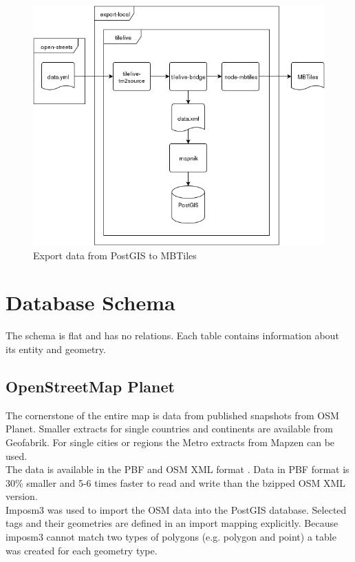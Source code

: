 \begin{figure}[H]
\centering
  \includegraphics[scale=0.6]{images/export_package_flow.png}
  \caption{Export data from PostGIS to MBTiles}
\end{figure}

\newpage
\section{Database Schema}\label{database-schema}
The schema is flat and has no relations. Each table contains information about its entity and geometry. 

\subsection{OpenStreetMap Planet}

The cornerstone of the entire map is \osm{} data from published snapshots from OSM Planet\cite{6_planet.osm.org_2015}.
Smaller extracts for single countries and continents are available from Geofabrik\cite{7_download.geofabrik.de_2015}.
For  single cities or regions the Metro extracts from Mapzen\cite{8_mapzen.com_2015} can be used.
\\
The data is available in the PBF\cite{9_wiki.openstreetmap.org_2015} and OSM XML format \cite{10_wiki.openstreetmap.org_2015}. 
Data in PBF format is 30\% smaller and 5-6 times faster to read and write than the bzipped OSM XML version.
\\
Imposm3 was used to import the OSM data into the PostGIS database.
Selected tags\cite{11_wiki.openstreetmap.org_2015} and their geometries are defined in an import mapping explicitly.
Because imposm3 cannot match two types of polygons (e.g. polygon and point) a table was created for each geometry type.

